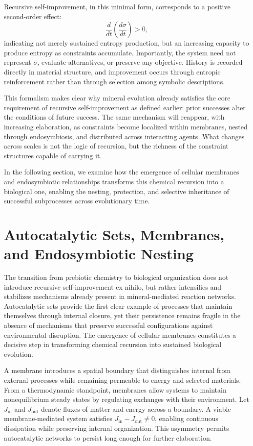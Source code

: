 \documentclass[11pt]{article}
\begin{document}
Recursive self-improvement, in this minimal form, corresponds to a positive second-order effect:
\begin{equation}
\frac{d}{dt}\left(\frac{d\sigma}{dt}\right) > 0,
\end{equation}
indicating not merely sustained entropy production, but an increasing capacity to produce entropy as constraints accumulate. Importantly, the system need not represent $\sigma$, evaluate alternatives, or preserve any objective. History is recorded directly in material structure, and improvement occurs through entropic reinforcement rather than through selection among symbolic descriptions.

This formalism makes clear why mineral evolution already satisfies the core requirement of recursive self-improvement as defined earlier: prior successes alter the conditions of future success. The same mechanism will reappear, with increasing elaboration, as constraints become localized within membranes, nested through endosymbiosis, and distributed across interacting agents. What changes across scales is not the logic of recursion, but the richness of the constraint structures capable of carrying it.

In the following section, we examine how the emergence of cellular membranes and endosymbiotic relationships transforms this chemical recursion into a biological one, enabling the nesting, protection, and selective inheritance of successful subprocesses across evolutionary time.

\section{Autocatalytic Sets, Membranes, and Endosymbiotic Nesting}

The transition from prebiotic chemistry to biological organization does not introduce recursive self-improvement ex nihilo, but rather intensifies and stabilizes mechanisms already present in mineral-mediated reaction networks. Autocatalytic sets provide the first clear example of processes that maintain themselves through internal closure, yet their persistence remains fragile in the absence of mechanisms that preserve successful configurations against environmental disruption. The emergence of cellular membranes constitutes a decisive step in transforming chemical recursion into sustained biological evolution.

A membrane introduces a spatial boundary that distinguishes internal from external processes while remaining permeable to energy and selected materials. From a thermodynamic standpoint, membranes allow systems to maintain nonequilibrium steady states by regulating exchanges with their environment. Let $J_{\text{in}}$ and $J_{\text{out}}$ denote fluxes of matter and energy across a boundary. A viable membrane-mediated system satisfies $J_{\text{in}} - J_{\text{out}} \neq 0$, enabling continuous dissipation while preserving internal organization. This asymmetry permits autocatalytic networks to persist long enough for further elaboration.
\end{document}
